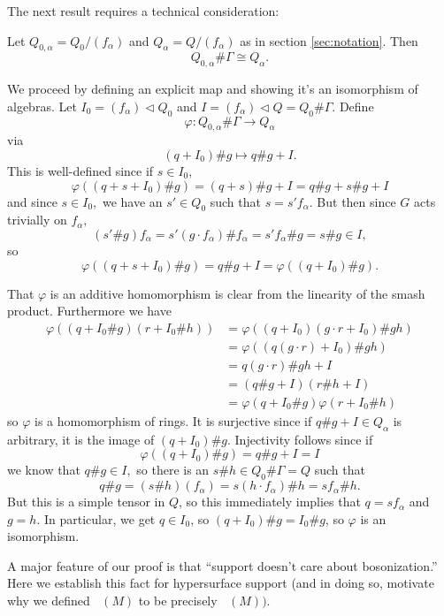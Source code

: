 \documentclass [11pt, proquest] {uwthesis}[2020/02/24]
\DeclareMathOperator{\supprR}{supp^\mathit{rnk}_R}
\DeclareMathOperator{\supprRnaught}{supp^\mathit{rnk}_{R_0}}
\begin{document}
    The next result requires a technical consideration:
    \begin{lem}\label{lem:bosonization-commutes-quotient}
        Let $Q_{0,\alpha}=Q_0/(f_\alpha)$ and $Q_\alpha=Q/(f_\alpha)$ as in section \ref{sec:notation}. Then 
        \[Q_{0,\alpha}\#\Gamma \cong Q_\alpha.\]
    \end{lem}
    \begin{prf}
        We proceed by defining an explicit map and showing it's an isomorphism of algebras. Let $I_0=(f_\alpha)\lhd Q_0$ and $I=(f_\alpha)\lhd Q=Q_0\#\Gamma.$ Define
        \[\varphi:Q_{0,\alpha}\#\Gamma\to Q_\alpha\]
        via 
        \[(q + I_0)\# g\mapsto q\# g + I.\]
        This is well-defined since if $s\in I_0,$
        \[\varphi((q+s+I_0)\# g)=(q+s)\# g + I=q\#g + s\#g + I\]
        and since $s\in I_0,$ we have an $s'\in Q_0$ such that $s=s'f_\alpha.$ But then since $G$ acts trivially on $f_\alpha,$
        \[(s'\# g)f_\alpha= s'(g\cdot f_\alpha)\# f_\alpha=s'f_\alpha\# g= s\# g\in I,\]
        so
        \[\varphi((q+s+I_0)\#g)=q\#g + I=\varphi((q+I_0)\#g).\]
        
        That $\varphi$ is an additive homomorphism is clear from the linearity of the smash product. Furthermore we have
        \begin{align*}
            \varphi((q + I_0\# g)(r + I_0\#h))&= \varphi((q+I_0)(g\cdot r+I_0)\# gh)\\
            &= \varphi((q(g\cdot r)+I_0)\#gh)\\
            &= q(g\cdot r)\# gh + I\\
            &= (q\# g + I)(r\# h + I)\\
            &=\varphi(q + I_0\# g)\varphi(r + I_0\#h)
        \end{align*}
        so $\varphi$ is a homomorphism of rings. It is surjective since if $q\#g + I\in Q_\alpha$ is arbitrary, it is the image of $(q+I_0)\#g.$ Injectivity follows since if 
        \[\varphi((q+I_0)\#g)=q\#g + I=I\]
        we know that $q\#g\in I,$ so there is an $s\# h\in Q_0\#\Gamma=Q$ such that 
        \[q\# g = (s\# h)(f_\alpha)=s(h\cdot f_\alpha)\# h=sf_\alpha\# h.\]
        But this is a simple tensor in $Q$, so this immediately implies that $q=sf_\alpha$ and $g=h.$ In particular, we get $q\in I_0$, so $(q+I_0)\#g = I_0\# g$, so $\varphi$ is an isomorphism.
    \end{prf}
    
    A major feature of our proof is that ``support doesn't care about bosonization.'' Here we establish this fact for hypersurface support (and in doing so, motivate why we defined $\supprR(M)$ to be precisely $\supprRnaught(M)).$
    
\end{document}
